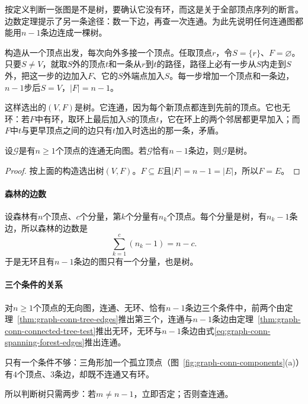 按定义判断一张图是不是树，要确认它没有环，而这是关于全部顶点序列的断言。边数定理提示了另一条途径：数一下边，再查一次连通。为此先说明任何连通图都能用$n-1$条边连成一棵树。

构造从一个顶点出发，每次向外多接一个顶点。任取顶点$r$，令$S=\{r\}$、$F=\varnothing$。只要$S\neq V$，就取$S$外的顶点$t$和一条从$r$到$t$的路径，路径上必有一步从$S$内走到$S$外，把这一步的边加入$F$、它的$S$外端点加入$S$。每一步增加一个顶点和一条边，$n-1$步后$S=V$，$|F|=n-1$。

这样选出的$(V,F)$是树。它连通，因为每个新顶点都连到先前的顶点。它也无环：若$F$中有环，取环上最后加入$S$的顶点$t$，它在环上的两个邻居都更早加入；而$F$中$t$与更早顶点之间的边只有$t$加入时选出的那一条，矛盾。

\begin{theorem}
\label{thm:graph-conn-connected-tree-test}
设$\mathcal G$是有$n\geq1$个顶点的连通无向图。若$\mathcal G$恰有$n-1$条边，则$\mathcal G$是树。
\end{theorem}

\begin{proof}
按上面的构造选出树$(V,F)$。$F\subseteq E$且$|F|=n-1=|E|$，所以$F=E$。
\end{proof}

\paragraph{森林的边数}
设森林有$n$个顶点、$c$个分量，第$k$个分量有$n_k$个顶点。每个分量是树，有$n_k-1$条边，所以森林的边数是
\begin{equation}
\sum_{k=1}^{c}(n_k-1)=n-c.
\label{eq:graph-conn-spanning-forest-edges}
\end{equation}
于是无环且有$n-1$条边的图只有一个分量，也是树。

\paragraph{三个条件的关系}
对$n\geq1$个顶点的无向图，连通、无环、恰有$n-1$条边三个条件中，前两个由定理~\ref{thm:graph-conn-tree-edges}推出第三个，连通与$n-1$条边由定理~\ref{thm:graph-conn-connected-tree-test}推出无环，无环与$n-1$条边由式\eqref{eq:graph-conn-spanning-forest-edges}推出连通。

只有一个条件不够：三角形加一个孤立顶点（图~\ref{fig:graph-conn-components}(a)）有$4$个顶点、$3$条边，却既不连通又有环。

所以判断树只需两步：若$m\neq n-1$，立即否定；否则查连通。

